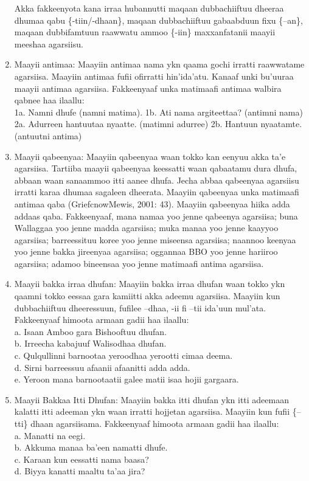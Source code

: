 \documentclass[11pt,b5paper]{book}
\begin{document}
\begin{enumerate}
Akka fakkeenyota kana irraa hubannutti maqaan dubbachiiftuu dheeraa dhumaa qabu \{-tiin/-dhaan\}, maqaan dubbachiiftuu gabaabduun fixu \{–an\}, maqaan dubbifamtuun raawwatu ammoo \{-iin\} maxxanfatanii maayii meeshaa agarsiisu.

	\item{Maayii antimaa}: Maayiin antimaa nama ykn qaama gochi irratti raawwatame agarsiisa. Maayiin antimaa fufii ofirratti hin’ida’atu. Kanaaf unki bu’uuraa maayii antimaa agarsiisa\cite{griefenow2001grammatical}. Fakkeenyaaf unka matimaafi antimaa walbira qabnee haa ilaallu:\\
1a. Namni dhufe (namni matima).
1b. Ati nama argiteettaa? (antimni nama)
2a. Adurreen hantuutaa nyaatte. (matimni adurree)
2b. Hantuun nyaatamte. (antuutni antima)

	\item{Maayii qabeenyaa}: Maayiin qabeenyaa waan tokko kan eenyuu akka ta’e agarsiisa. Tartiiba maayii qabeenyaa keessatti waan qabaatamu dura dhufa, abbaan waan sanaammoo itti aanee dhufa. Jecha abbaa qabeenyaa agarsiisu irratti karaa dhumaa sagaleen dheerata. Maayiin qabeenyaa unka matimaafi antimaa qaba (GriefcnowMewis, 2001: 43). Maayiin qabeenyaa hiika adda addaas qaba. Fakkeenyaaf, mana namaa yoo jenne qabeenya agarsiisa; buna Wallaggaa yoo jenne madda agarsiisa; muka manaa yoo jenne kaayyoo agarsiisa; barreessituu koree yoo jenne miseensa agarsiisa; naannoo keenyaa yoo jenne bakka jireenyaa agarsiisa; oggannaa BBO yoo jenne hariiroo agarsiisa; adamoo bineensaa yoo jenne matimaafi antima agarsiisa. 
	
		\item{Maayii bakka irraa dhufan}: Maayiin bakka irraa dhufan waan tokko ykn qaamni tokko eessaa gara kamiitti akka adeemu agarsiisa. Maayiin kun dubbachiiftuu dheeressuun, fufilee –dhaa, -ii fi –tii ida’uun
		mul’ata\cite{griefenow2001grammatical}. Fakkeenyaaf himoota armaan gadii haa ilaallu:\\
		a. Isaan Amboo gara Bishooftuu dhufan.\\
		b. Irreecha kabajuuf Walisodhaa dhufan.\\
		c. Qulqullinni barnootaa yeroodhaa yerootti cimaa deema.\\
		d. Sirni barreessuu afaanii afaanitti adda adda.\\
		e. Yeroon mana barnootaatii galee matii isaa hojii gargaara. 
		
		\item{Maayii Bakkaa Itti Dhufan}: Maayiin bakka itti dhufan ykn itti adeemaan kalatti itti adeeman ykn waan irratti hojjetan agarsiisa. Maayiin kun fufii \{–tti\} dhaan agarsiisama. Fakkeenyaaf himoota armaan gadii haa ilaallu:\\
		a. Manatti na eegi.\\
		b. Akkuma manaa ba’een namatti dhufe.\\
		c. Karaan kun eessatti nama baasa?\\
		d. Biyya kanatti maaltu ta’aa jira?

\end{enumerate}
\end{document}
